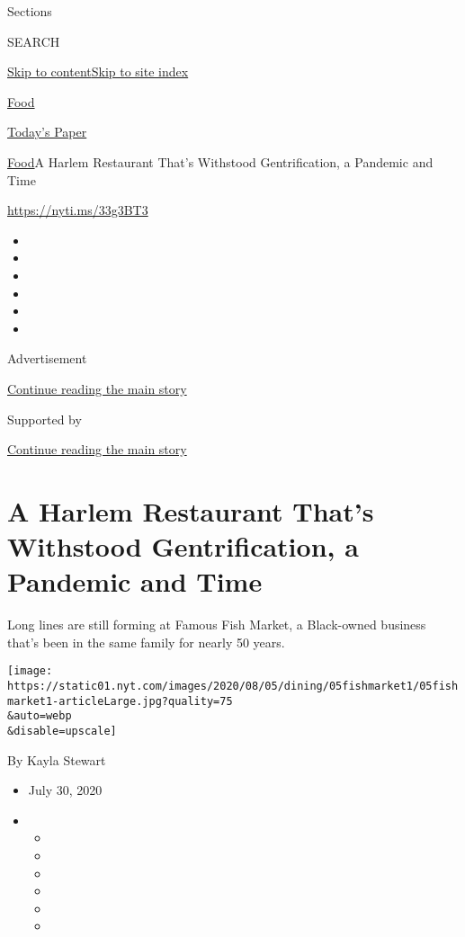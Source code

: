 Sections

SEARCH

\protect\hyperlink{site-content}{Skip to
content}\protect\hyperlink{site-index}{Skip to site index}

\href{https://www.nytimes.com/section/food}{Food}

\href{https://myaccount.nytimes.com/auth/login?response_type=cookie\&client_id=vi}{}

\href{https://www.nytimes.com/section/todayspaper}{Today's Paper}

\href{/section/food}{Food}\textbar{}A Harlem Restaurant That's Withstood
Gentrification, a Pandemic and Time

\url{https://nyti.ms/33g3BT3}

\begin{itemize}
\item
\item
\item
\item
\item
\item
\end{itemize}

Advertisement

\protect\hyperlink{after-top}{Continue reading the main story}

Supported by

\protect\hyperlink{after-sponsor}{Continue reading the main story}

\hypertarget{a-harlem-restaurant-thats-withstood-gentrification-a-pandemic-and-time}{%
\section{A Harlem Restaurant That's Withstood Gentrification, a Pandemic
and
Time}\label{a-harlem-restaurant-thats-withstood-gentrification-a-pandemic-and-time}}

Long lines are still forming at Famous Fish Market, a Black-owned
business that's been in the same family for nearly 50 years.

\texttt{[image: https://static01.nyt.com/images/2020/08/05/dining/05fishmarket1/05fishmarket1-articleLarge.jpg?quality=75\\\&auto=webp\\\&disable=upscale]}

By Kayla Stewart

\begin{itemize}
\item
  July 30, 2020
\item
  \begin{itemize}
  \item
  \item
  \item
  \item
  \item
  \item
  \end{itemize}
\end{itemize}

